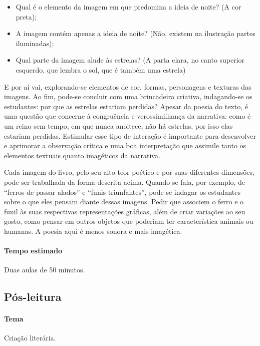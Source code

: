\documentclass[11pt]{extarticle}
\begin{document}
\begin{itemize}
\item Qual é o elemento da imagem em que predomina a ideia de noite? (A cor preta);
\item A imagem contém apenas a ideia de noite? (Não, existem na ilustração partes iluminadas);
\item Qual parte da imagem alude às estrelas? (A parta clara, no canto superior esquerdo, que lembra o sol, que é também uma estrela)
\end{itemize}

E por aí vai, explorando-se elementos de cor, formas, personagens e texturas das imagens. Ao fim, pode-se concluir com uma brincadeira criativa, indagando-se os estudantes: por que as estrelas estariam perdidas? Apesar da poesia do texto, é uma questão que concerne à congruência e verossimilhança da narrativa: como é um reino sem tempo, em que nunca anoitece, não há estrelas, por isso elas estariam perdidas. Estimular esse tipo de interação é importante para desenvolver e aprimorar a observação crítica e uma boa interpretação que assimile tanto os elementos textuais quanto imagéticos da narrativa.

Cada imagem do livro, pelo seu alto teor poético e por suas diferentes dimensões, pode ser trabalhada da forma descrita acima.
Quando se fala, por exemplo, de ``ferros de passar alados'' e ``funis triunfantes'',
pode-se indagar os estudantes sobre o que eles pensam diante dessas imagens. Pedir que associem o ferro e o funil às suas respectivas representações gráficas, além de criar variações ao seu gosto, como pensar em outros objetos que poderiam ter característica animais ou humanas. A poesia aqui é menos sonora e mais imagética.

\paragraph{Tempo estimado} Duas aulas de 50 minutos.

\subsection{Pós-leitura}



\paragraph{Tema} Criação literária.
\end{document}
